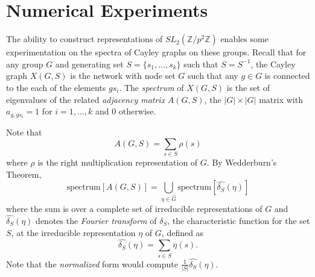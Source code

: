 \documentclass[12pt,reqno]{amsart}
\theoremstyle{remark}
\numberwithin{table}{section}
\newcommand{\Z}{\mathbb Z}
\newcommand{\slpsq}{SL_2(\Z/p^2 \Z)}
\begin{document}
\pagebreak
\clearpage
%
%
%
%
%
%
%
%
%
%
%
%
%
\section{Numerical Experiments}

The ability to construct representations of $\slpsq$ enables some experimentation on the spectra of Cayley graphs on these groups. Recall that for any group $G$ and generating set $S = \{s_1,\dots, s_k\}$ such that $S=S^{-1}$, the Cayley graph $X(G,S)$ is the network with node set $G$ such that any $g\in G$ is connected to the each of the elements $gs_i$. The {\em spectrum} of $X(G,S)$ is the set of eigenvalues of the related {\em adjacency matrix} $A(G,S)$, the $|G|\times |G|$ matrix with 
$a_{g,gs_i} = 1$ for $i=1,\dots,k$ and $0$ otherwise. 

Note that 
$$A(G,S) = \sum_{s\in S} \rho(s)$$
where $\rho$ is the right multiplication representation of $G$. By Wedderburn's Theorem, 
$$\mbox{spectrum}\left[A(G,S)\right] = \bigcup_{\eta \in \widehat{G}} \mbox{spectrum}\left[\widehat{\delta_S}(\eta)\right]$$
where the sum is over a complete set of irreducible representations of $G$ and $\widehat{\delta_S}(\eta)$ denotes the {\em Fourier transform} of $\delta_S$, the characteristic function for the set $S$, at the irreducible representation $\eta$ of $G$, defined as 
$$\widehat{\delta_S}(\eta) = \sum_{s\in S}\eta(s).$$
Note that the {\em normalized} form would compute ${\frac{1}{|S|}} \widehat{\delta_S}(\eta)$. 
\end{document}
